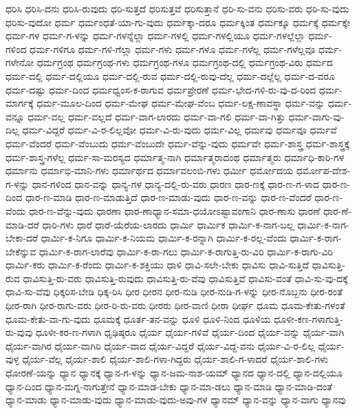 {ಧರಿಸಿ
ಧರಿಸಿ-ದನು
ಧರಿಸಿ-ರುವುದು
ಧರಿ-ಸುತ್ತದೆ
ಧರಿಸುತ್ತವೆ
ಧರಿಸುತ್ತಾನೆ
ಧರಿ-ಸು-ವನು
ಧರಿಸು-ವರು
ಧರಿ-ಸು-ವುದು
ಧರಿಸು-ವುದೋ
ಧರ್ಮ
ಧರ್ಮಂಧತೆ-ಯಾ-ಗು-ವುದು
ಧರ್ಮಕ್ಕಾ-ದರೂ
ಧರ್ಮಕ್ಕಿಂತ
ಧರ್ಮಕ್ಕೂ
ಧರ್ಮಕ್ಕೆ
ಧರ್ಮಕ್ಕೇ
ಧರ್ಮ-ಗಳ
ಧರ್ಮ-ಗ-ಳನ್ನು
ಧರ್ಮ-ಗಳನ್ನೆಲ್ಲಾ
ಧರ್ಮ-ಗಳಲ್ಲಿ
ಧರ್ಮ-ಗಳಲ್ಲಿಯೂ
ಧರ್ಮ-ಗಳಲ್ಲೆಲ್ಲಾ
ಧರ್ಮ-ಗಳಿಂದ
ಧರ್ಮ-ಗಳಿಗೂ
ಧರ್ಮ-ಗಳಿ-ಗೆಲ್ಲಾ
ಧರ್ಮ-ಗಳು
ಧರ್ಮ-ಗಳೂ
ಧರ್ಮ-ಗಳೆಲ್ಲ
ಧರ್ಮ-ಗಳೆಲ್ಲವೂ
ಧರ್ಮ-ಗಳೇನೋ
ಧರ್ಮಗ್ರಂಥ
ಧರ್ಮಗ್ರಂಥ-ಗಳು
ಧರ್ಮಗ್ರಂಥ-ಗಳೂ
ಧರ್ಮಗ್ರಂಥ-ದಲ್ಲಿ
ಧರ್ಮಗ್ರಂಥ-ವಿರು
ಧರ್ಮದ
ಧರ್ಮ-ದಲ್ಲಿ
ಧರ್ಮ-ದಲ್ಲಿಯೂ
ಧರ್ಮ-ದಲ್ಲಿ-ರುವ
ಧರ್ಮ-ದಲ್ಲಿ-ರುವು-ದೆಲ್ಲ
ಧರ್ಮ-ದಲ್ಲೆಲ್ಲ
ಧರ್ಮ-ದ-ವರೂ
ಧರ್ಮ-ದಷ್ಟು
ಧರ್ಮ-ದಿಂದ
ಧರ್ಮಧ್ವಂಸ-ಕ-ರಾಗುವ
ಧರ್ಮಪ್ರೇರಣೆ
ಧರ್ಮ-ಭೇದ-ಗಳಿ-ರು-ವು-ದ-ರಿಂದ
ಧರ್ಮ-ಮಾರ್ಗಕ್ಕೆ
ಧರ್ಮ-ಮೂಲ-ದಿಂದ
ಧರ್ಮ-ಮೇಘ
ಧರ್ಮ-ಮೇಘ-ವೆಂಬ
ಧರ್ಮ-ಲಕ್ಷ-ಣಾವಸ್ಥಾ
ಧರ್ಮ-ವನ್ನು
ಧರ್ಮ-ವನ್ನೂ
ಧರ್ಮ-ವಲ್ಲ
ಧರ್ಮ-ವಲ್ಲದೆ
ಧರ್ಮ-ವಾಗ-ಲಾರದು
ಧರ್ಮ-ವಾ-ಗಲಿ
ಧರ್ಮ-ವಾ-ಗಿತ್ತು
ಧರ್ಮ-ವಾಗು-ವು-ದಿಲ್ಲ
ಧರ್ಮ-ವಿದ್ದರೆ
ಧರ್ಮ-ವಿ-ರ-ಲಿಲ್ಲವೋ
ಧರ್ಮ-ವಿ-ರು-ವುದು
ಧರ್ಮ-ವಿಲ್ಲ
ಧರ್ಮವು
ಧರ್ಮವೂ
ಧರ್ಮವೆ
ಧರ್ಮ-ವೆಂದರೆ
ಧರ್ಮ-ವೆಂಬುದು
ಧರ್ಮ-ವೆಂಬುದೇ
ಧರ್ಮ-ವೆನ್ನು-ವುದು
ಧರ್ಮವೇ
ಧರ್ಮ-ಶಾಸ್ತ್ರ
ಧರ್ಮ-ಶಾಸ್ತ್ರಕ್ಕೆ
ಧರ್ಮ-ಶಾಸ್ತ್ರ-ಗಳೆಲ್ಲ
ಧರ್ಮ-ಸಾ-ಮರಸ್ಯದ
ಧರ್ಮಾತ್ಮ-ನಾಗಿ
ಧರ್ಮಾತ್ಮರಾದಂಥ
ಧರ್ಮಾತ್ಮರು
ಧರ್ಮಾಧಿ-ಕಾರಿ-ಗಳ
ಧರ್ಮಾನು
ಧರ್ಮಾಭಿ-ಮಾನಿ-ಗಳು
ಧರ್ಮಾರ್ಥದ
ಧರ್ಮಾವಲಂಬಿ-ಗಳು
ಧರ್ಮೀ
ಧರ್ಮೋದಯ
ಧರ್ಮೋಪ-ದೇಶ-ಗ-ಳನ್ನು
ಧಾನ-ಗಳಿಂದ
ಧಾನ-ವನ್ನು
ಧಾನ್ಯ-ಗಳ
ಧಾನ್ಯ-ದಲ್ಲಿ-ರು-ವರು
ಧಾರಣ
ಧಾರ-ಣಕ್ಕೆ
ಧಾರ-ಣ-ಗ-ಳಾದ
ಧಾರ-ಣ-ದಿಂದ
ಧಾರ-ಣ-ಮಾಡಿ
ಧಾರ-ಣ-ಮಾಡುತ್ತಿದೆ
ಧಾರ-ಣ-ಮಾಡು-ವುದು
ಧಾರ-ಣ-ವನ್ನು
ಧಾರ-ಣ-ವೆಂದರೆ
ಧಾರ-ಣ-ವೆಂದು
ಧಾರ-ಣ-ವೆನ್ನು-ವುದು
ಧಾರಣಾ
ಧಾರ-ಣಾಧ್ಯಾನ-ಸಮಾ-ಧಯೋಽಷ್ಟಾವಂಗಾನಿ
ಧಾರ-ಣಾಸು
ಧಾರಣೆ
ಧಾರ-ಣೆ-ಮಾಡಿ-ದರೆ
ಧಾರಿ-ಗಳು
ಧಾರೆ
ಧಾರೆ-ಯೆರೆಯ-ಲಾರದು
ಧಾರ್ಮಿ
ಧಾರ್ಮಿಕ
ಧಾರ್ಮಿ-ಕ-ನಾಗ-ಬಲ್ಲ
ಧಾರ್ಮಿ-ಕ-ನಾಗ-ಬೇಕಾ-ದರೆ
ಧಾರ್ಮಿ-ಕ-ನಿಗೂ
ಧಾರ್ಮಿ-ಕ-ನಿಯಮ
ಧಾರ್ಮಿ-ಕ-ರನ್ನಾಗಿ
ಧಾರ್ಮಿ-ಕ-ರಲ್ಲ-ವೆಂದು
ಧಾರ್ಮಿ-ಕ-ರಾಗ-ಬೇಕೆನ್ನುವ
ಧಾರ್ಮಿ-ಕ-ರಾಗ-ಲಾರೆವು
ಧಾರ್ಮಿ-ಕ-ರಾ-ಗಲು
ಧಾರ್ಮಿ-ಕ-ರಾಗುತ್ತಿ-ರು-ವಿರಿ
ಧಾರ್ಮಿ-ಕ-ರಾಗು-ವಿರಿ
ಧಾರ್ಮಿ-ಕರು
ಧಾರ್ಮಿ-ಕ-ರೆಂದು
ಧಾರ್ಮಿ-ಕ-ಶಕ್ತಿಯು
ಧಾಳಿ
ಧಾವಿ-ಸಲೇ-ಬೇಕು
ಧಾವಿಸು
ಧಾವಿ-ಸುತ್ತಿದೆ
ಧಾವಿಸುತ್ತಿ-ರುವ
ಧಾವಿಸುತ್ತಿ-ರು-ವರು
ಧಾವಿಸುತ್ತಿ-ರುವುದು
ಧಾವಿಸುತ್ತಿ-ರು-ವೆವು
ಧಾವಿಸುತ್ತಿವೆ
ಧಾವಿಸು-ವಂತೆ
ಧಾವಿ-ಸು-ವು-ದಕ್ಕೆ
ಧಾವಿ-ಸು-ವೆವು
ಧಿಕ್ಕರಿಸ-ಬೇಡಿ
ಧಿಕ್ಕ-ರಿಸಿ
ಧೀರ
ಧೀರನ
ಧೀರ-ನುಡಿ
ಧೀರ-ನುಡಿ-ಗ-ಳನ್ನು
ಧೀರ-ನೊಬ್ಬನು
ಧೀರ-ರಂತೆ
ಧೀರ-ರಾಗಿ
ಧೀರ-ರಾಗು-ವರು
ಧೀರ-ರಿ-ರು-ವರು
ಧೀರರು
ಧೀರ-ವಾಣಿ
ಧೀರಾ
ಧೀರ್ಘ
ಧೂಮ
ಧೂಮ-ಕೇತು-ಗಳಂತೆ
ಧೂಮ-ಕೇತು-ವಾ-ಗು-ವುದು
ಧೂಮಕ್ಕೆ
ಧೂರ್ತ-ತನ-ವನ್ನು
ಧೂಳಿ
ಧೂಳಿ-ನಿಂದ
ಧೂಳಿಯ
ಧೂಳೀ-ಕಣ-ಗಳಾಗುತ್ತಿ-ರು-ವುವು
ಧೂಳೀ-ಕರ-ಣ-ಗಳಾಗಿ
ಧೃಢಿಷ್ಠರೂ
ಧೈರ್ಯ
ಧೈರ್ಯ-ಗಳಿವೆ
ಧೈರ್ಯ-ದಿಂದ
ಧೈರ್ಯ-ವನ್ನು
ಧೈರ್ಯ-ವಾಗಿ
ಧೈರ್ಯ-ವಾಗಿರ
ಧೈರ್ಯ-ವಾಗಿರಿ
ಧೈರ್ಯ-ವಾದ
ಧೈರ್ಯ-ವಿದ್ದರೆ
ಧೈರ್ಯ-ವಿದ್ದ-ವನು
ಧೈರ್ಯ-ವಿ-ರ-ಲಿಲ್ಲ
ಧೈರ್ಯ-ವುಳ್ಳ
ಧೈರ್ಯ-ವೆಲ್ಲ
ಧೈರ್ಯ-ಶಾಲಿ
ಧೈರ್ಯ-ಶಾಲಿ-ಗಳಾ-ಗಿದ್ದರು
ಧೈರ್ಯ-ಶಾಲಿ-ಗ-ಳಾದರೆ
ಧೈರ್ಯ-ಶಾಲಿ-ಗಳು
ಧೋರಣೆ-ಯನ್ನು
ಧ್ಯಾನ
ಧ್ಯಾನಕ್ಕೆ
ಧ್ಯಾನ-ಗ-ಳನ್ನು
ಧ್ಯಾನ-ಜಮ-ನಾಶ-ಯಮ್
ಧ್ಯಾನದ
ಧ್ಯಾನ-ದಲ್ಲಿ
ಧ್ಯಾನ-ದಲ್ಲಿಯೂ
ಧ್ಯಾನ-ದಿಂದ
ಧ್ಯಾನ-ಮಗ್ನ-ನಾಗುತ್ತೇನೆ
ಧ್ಯಾನ-ಮಾಡ-ಬೇಕು
ಧ್ಯಾನ-ಮಾ-ಡಲು
ಧ್ಯಾನ-ಮಾಡಿ
ಧ್ಯಾನ-ಮಾಡಿ-ದಂತೆ
ಧ್ಯಾನ-ಮಾಡು
ಧ್ಯಾನ-ಮಾಡು-ವುದು
ಧ್ಯಾನ-ಮಾಡು-ವುದು-ಅವು-ಗಳ
ಧ್ಯಾನಮ್
ಧ್ಯಾನ-ವನ್ನು
ಧ್ಯಾನ-ವಾಗು
ಧ್ಯಾನವು
}

